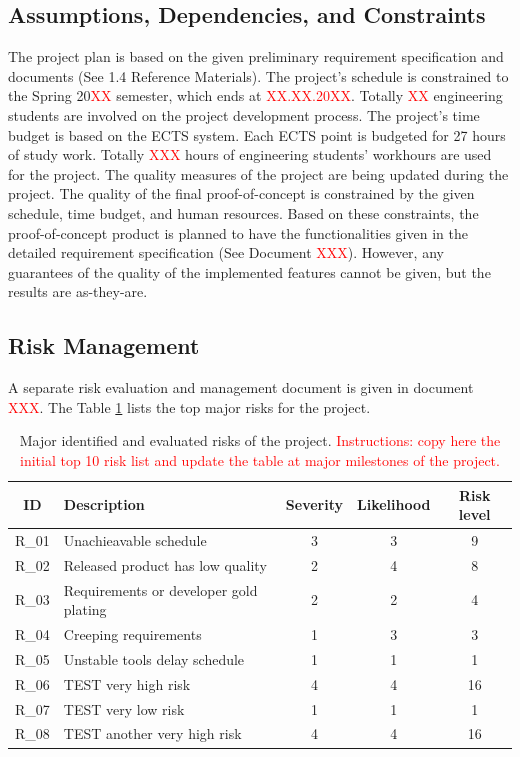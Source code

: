\documentclass{article}
\begin{document}
\subsection{Assumptions, Dependencies, and Constraints}
The project plan is based on the given preliminary requirement specification and
documents (See 1.4 Reference Materials).
The project’s schedule is constrained to the Spring 20\textcolor{red}{XX} semester, which ends
at \textcolor{red}{XX.XX.20XX}. Totally \textcolor{red}{XX} engineering students are involved on the project
development process.
The project’s time budget is based on the ECTS system. Each ECTS point is
budgeted for 27 hours of study work. Totally \textcolor{red}{XXX} hours of engineering students’
workhours are used for the project.
The quality measures of the project are being updated during the project. The
quality of the final proof-of-concept is constrained by the given schedule, time
budget, and human resources. Based on these constraints, the proof-of-concept
product is planned to have the functionalities given in the detailed requirement
specification (See Document \textcolor{red}{XXX}). However, any guarantees of the quality of the
implemented features cannot be given, but the results are as-they-are.
\subsection{Risk Management}
A separate risk evaluation and management document is given in document \textcolor{red}{XXX}.
The Table \ref{tab:project_risks} lists the top major risks for the project.

\begin{table}[h]
\centering
\caption{Major identified and evaluated risks of the project. \textcolor{red} {Instructions: copy
here the initial top 10 risk list and update the table at major milestones of the
project. }}

\label{tab:project_risks}
\begin{tabular}{|c|l|c|c|c|}
\hline
\textbf{ID} & \textbf{Description} & \textbf{Severity} & \textbf{Likelihood} & \textbf{Risk level} \\
\hline
R\_01 & Unachieavable schedule & 3 & 3 & \cellcolor{yellow} 9 \\
\hline
R\_02 & Released product has low quality & 2 & 4 & \cellcolor{yellow} 8 \\
\hline
R\_03 & Requirements or developer gold plating & 2 & 2 & \cellcolor{lightgreen} 4 \\
\hline
R\_04 & Creeping requirements & 1 & 3 & \cellcolor{lightgreen} 3 \\
\hline
R\_05 & Unstable tools delay schedule & 1 & 1 & \cellcolor{green} 1 \\
\hline
R\_06 & TEST very high risk & 4 & 4 & \cellcolor{red} 16 \\
\hline
R\_07 & TEST very low risk & 1 & 1 & \cellcolor{green}  1 \\
\hline
R\_08 & TEST another very high risk & 4 & 4 & \cellcolor{red} 16 \\
\hline
\end{tabular}
\end{table}
\end{document}
